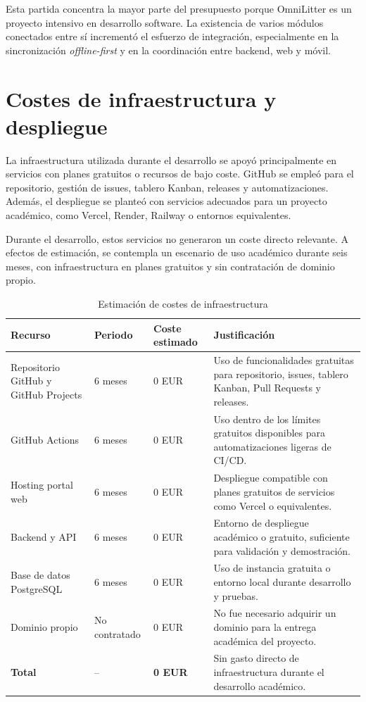 Esta partida concentra la mayor parte del presupuesto porque OmniLitter es un
proyecto intensivo en desarrollo software. La existencia de varios módulos
conectados entre sí incrementó el esfuerzo de integración, especialmente en la
sincronización \textit{offline-first} y en la coordinación entre backend, web y
móvil.

\section{Costes de infraestructura y despliegue}

La infraestructura utilizada durante el desarrollo se apoyó principalmente en
servicios con planes gratuitos o recursos de bajo coste. GitHub se empleó para el
repositorio, gestión de issues, tablero Kanban, releases y automatizaciones.
Además, el despliegue se planteó con servicios adecuados para un proyecto
académico, como Vercel, Render, Railway o entornos equivalentes.

Durante el desarrollo, estos servicios no generaron un coste directo relevante. A
efectos de estimación, se contempla un escenario de uso académico durante seis
meses, con infraestructura en planes gratuitos y sin contratación de dominio
propio.

\begin{table}[H]
\centering
\caption{Estimación de costes de infraestructura}
\label{tab:costes_infraestructura}
\small
\renewcommand{\arraystretch}{1.18}
\begin{tabularx}{\textwidth}{p{4.0cm}p{2.5cm}p{2.5cm}X}
\toprule
\textbf{Recurso} & \textbf{Periodo} & \textbf{Coste estimado} & \textbf{Justificación} \\
\midrule
Repositorio GitHub y GitHub Projects & 6 meses & 0 EUR & Uso de funcionalidades gratuitas para repositorio, issues, tablero Kanban, Pull Requests y releases. \\
GitHub Actions & 6 meses & 0 EUR & Uso dentro de los límites gratuitos disponibles para automatizaciones ligeras de CI/CD. \\
Hosting portal web & 6 meses & 0 EUR & Despliegue compatible con planes gratuitos de servicios como Vercel o equivalentes. \\
Backend y API & 6 meses & 0 EUR & Entorno de despliegue académico o gratuito, suficiente para validación y demostración. \\
Base de datos PostgreSQL & 6 meses & 0 EUR & Uso de instancia gratuita o entorno local durante desarrollo y pruebas. \\
Dominio propio & No contratado & 0 EUR & No fue necesario adquirir un dominio para la entrega académica del proyecto. \\
\midrule
\textbf{Total} & -- & \textbf{0 EUR} & Sin gasto directo de infraestructura durante el desarrollo académico. \\
\bottomrule
\end{tabularx}
\end{table}

